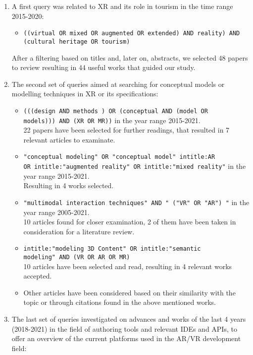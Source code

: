 \begin{enumerate}
    \item A first query was related to XR and its role in tourism in the time range 2015-2020:
        \begin{itemize}
            \item \texttt{((virtual OR mixed OR augmented OR extended) AND reality) AND (cultural heritage OR tourism)}
        \end{itemize}
        After a filtering based on titles and, later on, abstracts, we selected 48 papers to review resulting in 44 useful works that guided our study.
    \item The second set of queries aimed at searching for conceptual models or modelling techniques in XR or its specifications:
        \begin{itemize}
            \item \texttt{(((design  AND methods )  OR  (conceptual  AND  (model  OR\\ models))) AND (XR  OR  MR))} in the year range 2015-2021.\\
            22 papers have been selected for further readings, that resulted in 7 relevant articles to examinate.
            \item \texttt{"conceptual modeling" OR "conceptual model" intitle:AR\\ OR intitle:"augmented reality" OR intitle:"mixed reality"} in the year range 2015-2021.\\
            Resulting in 4 works selected.
            \item \texttt{"multimodal interaction techniques" AND " ("VR" OR "AR") "} in the year range 2005-2021.\\
            10 articles found for closer examination, 2 of them have been taken in consideration for a literature review.
            \item \texttt{intitle:"modeling 3D Content" OR  intitle:"semantic\\ modeling" AND (VR OR AR OR MR)}\\
            10 articles have been selected and read, resulting in 4 relevant works accepted.
            \item Other articles have been considered based on their similarity with the topic or through citations found in the above mentioned works.
        \end{itemize}
    \item The last set of queries investigated on advances and works of the last 4 years (2018-2021) in the field of authoring tools and relevant IDEs and APIs, to offer an overview of the current platforms used in the AR/VR development field:

\end{enumerate}

